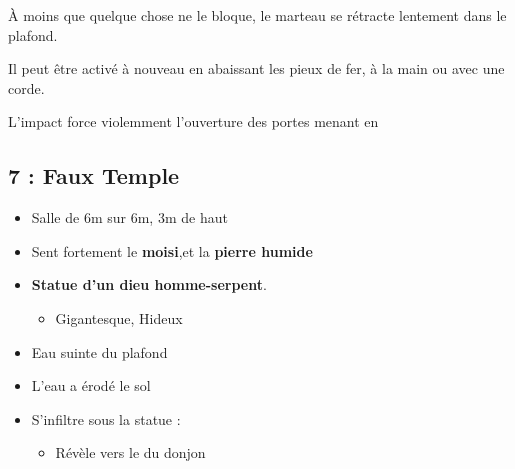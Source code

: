 À moins que quelque chose ne le bloque, le marteau se rétracte lentement dans le plafond.

Il peut être activé à nouveau en abaissant les pieux de fer, à la main ou avec une corde.

L'impact force violemment l'ouverture des portes menant en \textbf{}

\subsection{7 : Faux Temple}\label{n1:s7}
\begin{itemize}
  \item Salle de 6m sur 6m, 3m de haut
  \item Sent  fortement le \textbf{moisi},et la \textbf{pierre humide}
  \item \textbf{Statue d'un dieu homme-serpent}.
  \begin{itemize}
    \item Gigantesque, Hideux
  \end{itemize}
  \item Eau suinte du plafond
  \item L'eau a érodé le sol
  \item S'infiltre sous la statue :
  \begin{itemize}
    \item Révèle \textbf{} vers le \textbf{} du donjon
  \end{itemize}
\end{itemize}

